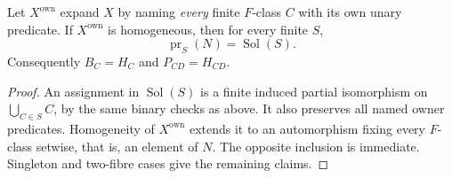 \begin{corollary}
\label{cor:finite-kernel-relative-homogeneity}
Let $X^{\mathrm{own}}$ expand $X$ by naming
\emph{every} finite $F$-class $C$ with its own
unary predicate. If $X^{\mathrm{own}}$ is
homogeneous, then for every finite $S$,
\[
             \operatorname{pr}_S(N)
                         =\operatorname{Sol}(S).
 \tag{FC4}\label{eq:finite-kernel-strong-projection}
\]
Consequently $B_C=H_C$ and $P_{CD}=H_{CD}$.
\end{corollary}
\begin{proof}
An assignment in $\operatorname{Sol}(S)$
is a finite induced partial isomorphism
on $\bigcup_{C\in S}C$, by the same binary
checks as above. It also preserves all
named owner predicates. Homogeneity of
$X^{\mathrm{own}}$ extends it to an
automorphism fixing every $F$-class setwise,
that is, an element of $N$. The opposite
inclusion is immediate. Singleton and
two-fibre cases give the remaining claims.
\end{proof}

